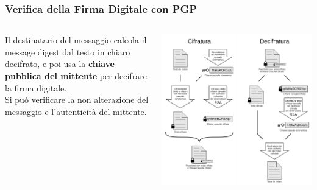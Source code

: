 \begin{frame}
	\frametitle{Verifica della Firma Digitale con PGP}

	\begin{columns}
		\begin{column}{0.4\textwidth}
			Il destinatario del messaggio calcola il message digest dal testo in chiaro decifrato, e poi usa la \textbf{chiave pubblica del mittente} per decifrare la firma digitale. \\
			Si può verificare la non alterazione del messaggio e l'autenticità del mittente.
		\end{column}

		\begin{column}{0.6\textwidth}
			\includegraphics[width=\textwidth]{img/1-img/PGP_diagram_IT.png}
		\end{column}
	\end{columns}

\end{frame}



